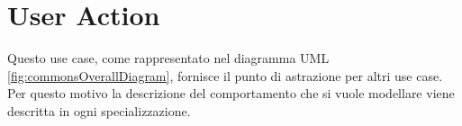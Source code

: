 \section{User Action}
\label{seq:userAction}
Questo use case, come rappresentato nel diagramma UML
\autoref{fig:commonsOverallDiagram}, fornisce il punto di astrazione per altri
use case. Per questo motivo la descrizione del comportamento che  si
vuole modellare viene descritta in ogni specializzazione.